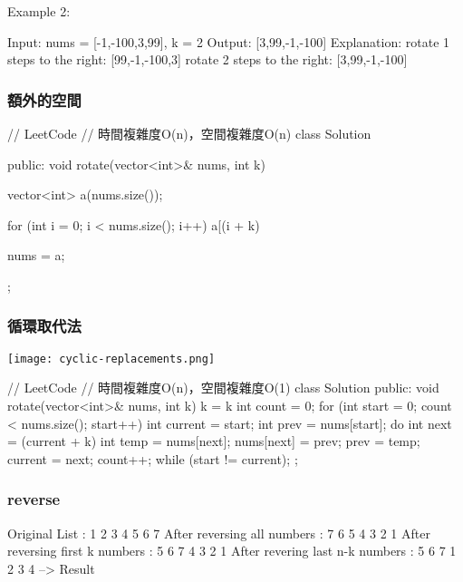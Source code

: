 Example 2:
\begin{Code}
Input: nums = [-1,-100,3,99], k = 2
Output: [3,99,-1,-100]
Explanation: 
rotate 1 steps to the right: [99,-1,-100,3]
rotate 2 steps to the right: [3,99,-1,-100]
\end{Code}

\subsubsection{額外的空間}
\begin{Code}
// LeetCode
// 時間複雜度O(n)，空間複雜度O(n)
class Solution {
public:
    void rotate(vector<int>& nums, int k) {
        vector<int> a(nums.size());

        for (int i = 0; i < nums.size(); i++)
            a[(i + k) %

        nums = a;
    }
};
\end{Code}

\subsubsection{循環取代法}
\begin{center}
\texttt{[image: cyclic-replacements.png]}\\
\label{fig:cyclic-replacements}
\end{center}

\begin{Code}
// LeetCode
// 時間複雜度O(n)，空間複雜度O(1)
class Solution {
public:
    void rotate(vector<int>& nums, int k) {
        k = k %
        int count = 0;
        for (int start = 0; count < nums.size(); start++) {
            int current = start;
            int prev = nums[start];
            do {
                int next = (current + k) %
                int temp = nums[next];
                nums[next] = prev;
                prev = temp;
                current = next;
                count++;
            } while (start != current);
        }
    }
};
\end{Code}

\subsubsection{reverse}
\begin{Code}
Original List                   : 1 2 3 4 5 6 7
After reversing all numbers     : 7 6 5 4 3 2 1
After reversing first k numbers : 5 6 7 4 3 2 1
After revering last n-k numbers : 5 6 7 1 2 3 4 --> Result
\end{Code}

